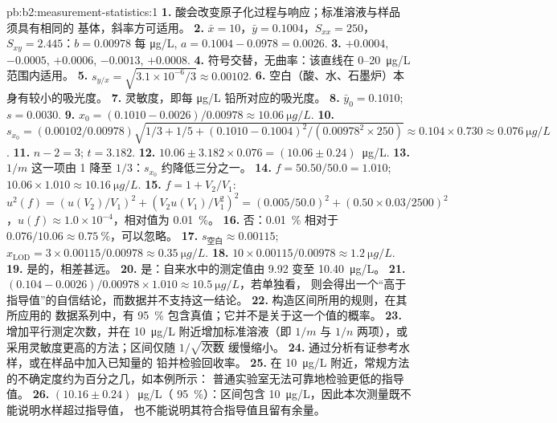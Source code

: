 \begin{solution}{pb:b2:measurement-statistics:1}
\textbf{1.} 酸会改变原子化过程与响应；标准溶液与样品须具有相同的
基体，斜率方可适用。
\textbf{2.} $\bar x = 10$，$\bar y = 0.1004$，$S_{xx} = 250$，$S_{xy} = 2.445$：$b = 0.00978$ 每
\unit{\micro g/L}, $a = 0.1004 - 0.0978 = 0.0026$.
\textbf{3.} $+0.0004$, $-0.0005$, $+0.0006$, $-0.0013$, $+0.0008$.
\textbf{4.} 符号交替，无曲率：该直线在 0--\qty{20}{\micro g/L} 范围内适用。
\textbf{5.} $s_{y/x} = \sqrt{3.1 \times 10^{-6}/3} \approx 0.00102$.
\textbf{6.} 空白（酸、水、石墨炉）本身有较小的吸光度。
\textbf{7.} 灵敏度，即每 \unit{\micro g/L} 铅所对应的吸光度。
\textbf{8.} $\bar y_0 = 0.1010$; $s = 0.0030$.
\textbf{9.} $x_0 = (0.1010 - 0.0026)/0.00978 \approx \qty{10.06}{\micro g/L}$.
\textbf{10.} $s_{x_0} = (0.00102/0.00978)\sqrt{1/3 + 1/5 + (0.1010 - 0.1004)^2/(0.00978^2 \times 250)}
\approx 0.104 \times 0.730 \approx \qty{0.076}{\micro g/L}$.
\textbf{11.} $n - 2 = 3$; $t = 3.182$.
\textbf{12.} $10.06 \pm 3.182 \times 0.076 = (10.06 \pm 0.24)$~\unit{\micro g/L}.
\textbf{13.} $1/m$ 这一项由 1 降至 $1/3$：$s_{x_0}$ 约降低三分之一。
\textbf{14.} $f = 50.50/50.0 = 1.010$; $10.06 \times 1.010 \approx \qty{10.16}{\micro g/L}$.
\textbf{15.} $f = 1 + V_2/V_1$: $u^2(f) = (u(V_2)/V_1)^2 + (V_2u(V_1)/V_1^2)^2 = (0.005/50.0)^2 +
(0.50 \times 0.03/2500)^2$，$u(f) \approx 1.0 \times 10^{-4}$，相对值为 0.01~\%。
\textbf{16.} 否：0.01~\% 相对于 $0.076/10.06 \approx 0.75~\%$，可以忽略。
\textbf{17.} $s_{\text{空白}} \approx 0.00115$; $x_{\mathrm{LOD}} = 3 \times 0.00115/0.00978 \approx
\qty{0.35}{\micro g/L}$.
\textbf{18.} $10 \times 0.00115/0.00978 \approx \qty{1.2}{\micro g/L}$.
\textbf{19.} 是的，相差甚远。
\textbf{20.} 是：自来水中的测定值由 9.92 变至 \qty{10.40}{\micro g/L}。
\textbf{21.} $(0.104 - 0.0026)/0.00978 \times 1.010 \approx \qty{10.5}{\micro g/L}$，若单独看，
则会得出一个“高于指导值”的自信结论，而数据并不支持这一结论。
\textbf{22.} 构造区间所用的规则，在其所应用的
数据系列中，有 95~\% 包含真值；它并不是关于这一个值的概率。
\textbf{23.} 增加平行测定次数，并在 \qty{10}{\micro g/L} 附近增加标准溶液（即 $1/m$ 与
$1/n$ 两项），或采用灵敏度更高的方法；区间仅随 $1/\sqrt{\text{次数}}$ 缓慢缩小。
\textbf{24.} 通过分析有证参考水样，或在样品中加入已知量的
铅并检验回收率。
\textbf{25.} 在 \qty{10}{\micro g/L} 附近，常规方法的不确定度约为百分之几，如本例所示：
普通实验室无法可靠地检验更低的指导值。
\textbf{26.} $\boldsymbol{(10.16 \pm 0.24)}$~\unit{\micro g/L}（ 95~\%）：区间包含
\qty{10}{\micro g/L}，因此本次测量既不能说明水样超过指导值，
也不能说明其符合指导值且留有余量。
\end{solution}
